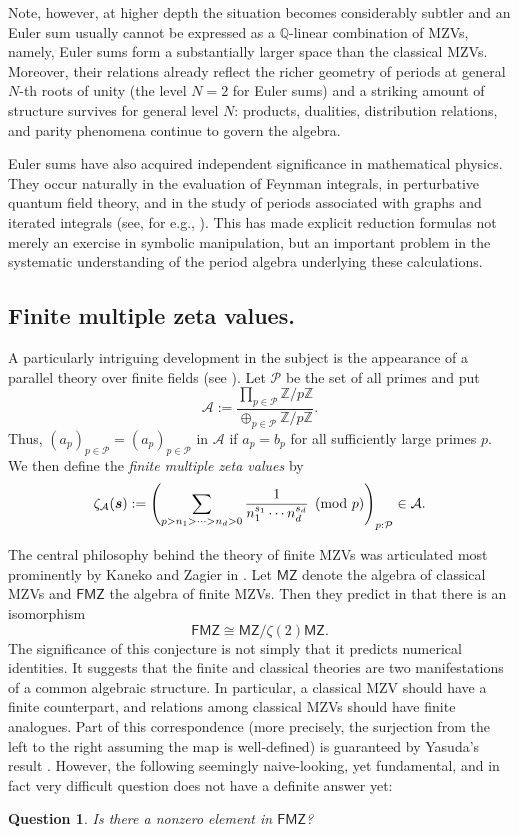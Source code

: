 \documentclass{article}
\newcommand{\FMZV}{\mathsf {FMZ}}
\newcommand{\MZV}{\mathsf {MZ}}
\newcommand{\bfs}{{\boldsymbol{\sl{s}}}}
\newcommand{\calA}{\mathcal{A}}
\newcommand{\calP}{\mathcal{P}}
\newcommand{\Z}{\mathbb{Z}}
\newcommand{\Q}{\mathbb{Q}}
\theoremstyle{plain}
\newtheorem{ques}[thm]{Question}
\theoremstyle{definition}
\begin{document}
Note, however, at higher depth the situation becomes considerably subtler and an Euler sum usually cannot be expressed as a $\Q$-linear combination of MZVs, namely, Euler sums form a substantially larger space than the classical MZVs. Moreover, their relations already reflect the richer geometry of periods at general $N$-th roots of unity (the level $N=2$ for Euler sums) and a striking amount of structure survives for general level $N$: products, dualities, distribution relations, and parity phenomena continue to govern the algebra.

Euler sums have also acquired independent significance in mathematical physics. They occur naturally in the evaluation of Feynman integrals, in perturbative quantum field theory, and in the study of periods associated with graphs and iterated integrals (see, for e.g., \cite{BlumleinBrVe2010,BorweinBrBr1997,Broadhurst1996a,BroadhurstKr1995}). This has made explicit reduction formulas not merely an exercise in symbolic manipulation, but an important problem in the systematic understanding of the period algebra underlying these calculations.


\subsection{Finite multiple zeta values.}
A particularly intriguing development in the subject is the appearance of a parallel theory over finite fields (see \cite{KanekoZa2026,Hoffman2004,Zhao2008a,Zhao2011c}). Let $\calP$ be the set of all primes and put
\begin{equation*}
\calA:= \frac{\prod_{p\in\calP} \Z/p\Z}{\oplus_{p\in\calP} \Z/p\Z}.
\end{equation*}
Thus, $(a_p)_{p\in\calP}=(a_p)_{p\in\calP}$ in $\calA$ if $a_p=b_p$ for all sufficiently large primes $p$. We then define the \emph{finite multiple zeta values} by
\begin{equation*}
\zeta_\calA(\bfs):=\left( \sum_{p>n_1>\dots>n_d>0}  \frac{1}{n_1^{s_1}\cdots n_d^{s_d}} \pmod{p}\right)_{p: \calP}\in \calA.
\end{equation*}

The central philosophy behind the theory of finite MZVs was articulated most prominently by Kaneko and Zagier in \cite[Main Conjecture]{KanekoZa2026}. Let $\MZV$ denote the algebra of classical MZVs and $\FMZV$ the algebra of finite MZVs. Then they predict in \cite{KanekoZa2026} that there is an isomorphism
$$
\FMZV \cong \MZV/\zeta(2)\MZV.
$$
The significance of this conjecture is not simply that it predicts numerical identities. It suggests that the finite and classical theories are two manifestations of a common algebraic structure. In particular, a classical MZV should have a finite counterpart, and relations among classical MZVs should have finite analogues. Part of this correspondence (more precisely, the surjection from the left to the right assuming the map is well-defined) is guaranteed by Yasuda's result \cite{Yasuda2016}. However, the following seemingly naive-looking, yet fundamental, and in fact very difficult question does not have a definite answer yet:
\begin{ques}
Is there a nonzero element in $\FMZV$?
\end{ques}
\end{document}
